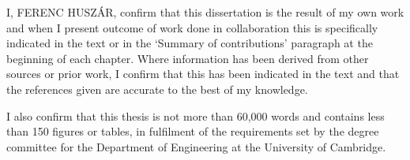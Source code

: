 \begin{declaration} %

I, FERENC HUSZ\'{A}R, confirm that this dissertation is the result of my own work and when I present outcome of work done in collaboration this is speciﬁcally indicated in the text or in the `Summary of contributions' paragraph at the beginning of each chapter. Where information has been derived from other sources or prior work, I confirm that this has been indicated in the text and that the references given are accurate to the best of my knowledge.

I also confirm that this thesis is not more than 60,000 words and contains less than 150 ﬁgures or tables, in fulfilment of the requirements set by the degree committee for the Department of Engineering at the University of Cambridge.

\end{declaration}